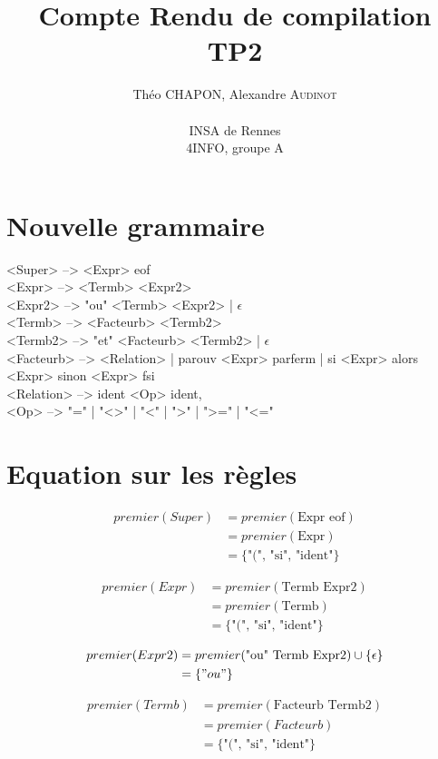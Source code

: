 \documentclass[a4paper,12pt]{article}
\author{
  Théo \textsc{CHAPON}, Alexandre \textsc{Audinot} \\ \\
  INSA de Rennes \\
  4INFO, groupe A
}
\title{Compte Rendu de compilation TP2}
\begin{document}


\section{Nouvelle grammaire}

<Super>    --> <Expr> eof \\
<Expr>     --> <Termb> <Expr2> \\
<Expr2>    --> "ou" <Termb> <Expr2> | $\epsilon$ \\
<Termb>    --> <Facteurb> <Termb2> \\
<Termb2>   --> "et" <Facteurb> <Termb2> | $\epsilon$ \\
<Facteurb> --> <Relation> | parouv <Expr> parferm | si <Expr> alors <Expr> sinon <Expr> fsi \\
<Relation> --> ident <Op> ident, \\
<Op>       --> "=" | "<>" | "<" | ">" | ">=" | "<=" \\


\section{Equation sur les règles}
\begin{align*}
premier(Super)&= premier(\text{Expr eof}) \\
        &= premier(\text{Expr}) \\
        &= \{\text{"(", "si", "ident"}\}
\end{align*}

\begin{align*}
premier(Expr)   &= premier(\text{Termb Expr2}) \\
        &= premier(\text{Termb}) \\
        &= \{\text{"(", "si", "ident"}\}  
\end{align*}

\begin{align*}
premier(Expr2)  &= premier(\text{"ou" Termb Expr2}) \cup \{\epsilon\} \\
        &= \{"ou"\}
\end{align*}

\begin{align*}
premier(Termb)  &= premier(\text{Facteurb Termb2}) \\
        &= premier(Facteurb) \\
        &= \{\text{"(", "si", "ident"}\}
\end{align*}
\end{document}
